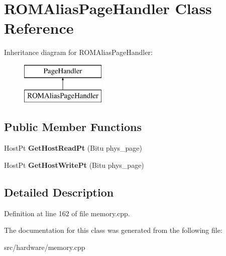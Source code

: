 \hypertarget{classROMAliasPageHandler}{\section{R\-O\-M\-Alias\-Page\-Handler Class Reference}
\label{classROMAliasPageHandler}
}
Inheritance diagram for R\-O\-M\-Alias\-Page\-Handler\-:\begin{figure}[H]
\begin{center}
\leavevmode
\includegraphics[height=2.000000cm]{classROMAliasPageHandler}
\end{center}
\end{figure}
\subsection*{Public Member Functions}
\begin{DoxyCompactItemize}
\item 
\hypertarget{classROMAliasPageHandler_ac9bc56f51008279f62a74204500ec4b3}{Host\-Pt {\bfseries Get\-Host\-Read\-Pt} (Bitu phys\-\_\-page)}\label{classROMAliasPageHandler_ac9bc56f51008279f62a74204500ec4b3}

\item 
\hypertarget{classROMAliasPageHandler_a305a02dd4698bb465b46e96268f2b375}{Host\-Pt {\bfseries Get\-Host\-Write\-Pt} (Bitu phys\-\_\-page)}\label{classROMAliasPageHandler_a305a02dd4698bb465b46e96268f2b375}

\end{DoxyCompactItemize}


\subsection{Detailed Description}


Definition at line 162 of file memory.\-cpp.



The documentation for this class was generated from the following file\-:\begin{DoxyCompactItemize}
\item 
src/hardware/memory.\-cpp\end{DoxyCompactItemize}
